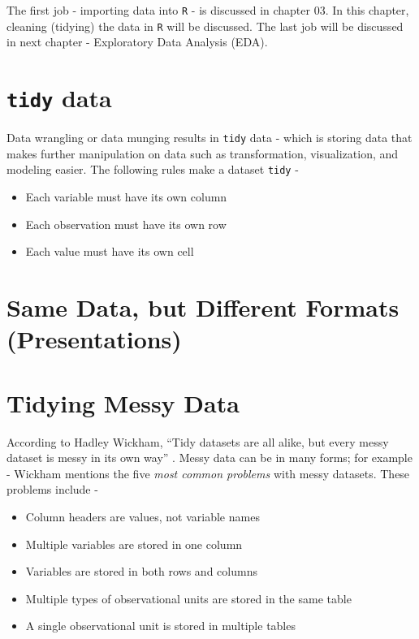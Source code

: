 \documentclass[
]{book}
\providecommand{\tightlist}{%
  \setlength{\itemsep}{0pt}\setlength{\parskip}{0pt}}
\begin{document}
The first job - importing data into \texttt{R} - is discussed in chapter 03. In this chapter, cleaning (tidying) the data in \texttt{R} will be discussed. The last job will be discussed in next chapter - Exploratory Data Analysis (EDA).

\hypertarget{tidy-data}{%
\section{\texorpdfstring{\texttt{tidy} data}{tidy data}}\label{tidy-data}}

Data wrangling or data munging results in \texttt{tidy} data - which is storing data that makes further manipulation on data such as transformation, visualization, and modeling easier. The following rules make a dataset \texttt{tidy} -

\begin{itemize}
\tightlist
\item
  Each variable must have its own column
\item
  Each observation must have its own row
\item
  Each value must have its own cell
\end{itemize}

\hypertarget{same-data-but-different-formats-presentations}{%
\section{Same Data, but Different Formats (Presentations)}\label{same-data-but-different-formats-presentations}}

\hypertarget{tidying-messy-data}{%
\section{Tidying Messy Data}\label{tidying-messy-data}}

According to Hadley Wickham, ``Tidy datasets are all alike, but every messy dataset is messy in its own way'' \citep{wickham_r_2017}. Messy data can be in many forms; for example - Wickham \citeyearpar{wickham_tidy_2014} mentions the five \emph{most common problems} with messy datasets. These problems include -

\begin{itemize}
\tightlist
\item
  Column headers are values, not variable names
\item
  Multiple variables are stored in one column
\item
  Variables are stored in both rows and columns
\item
  Multiple types of observational units are stored in the same table
\item
  A single observational unit is stored in multiple tables
\end{itemize}
\end{document}
